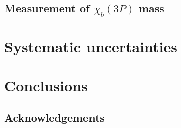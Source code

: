 \documentclass[12pt,a4paper]{report}
\begin{document}
\section{Measurement of $\chi_{b} (3P)$ mass}

\chapter{Systematic uncertainties}
\chapter{Conclusions}

\section*{Acknowledgements}

\renewcommand{\bibname}{References}%

\end{document}
